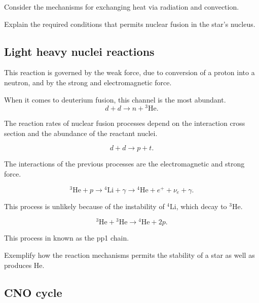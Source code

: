 \documentclass[openany]{book}
\begin{document}
Consider the mechanisms for exchanging heat via radiation and convection.

Explain the required conditions that permits nuclear fusion in the star's nucleus.

\subsection{Light heavy nuclei reactions} \label{sub:lightReactions}

This reaction is governed by the weak force, due to conversion of a proton into a neutron, and by the strong and electromagnetic force.

When it comes to deuterium fusion, this channel is the most abundant.\\

\begin{equation} \label{eq:reaction_2Hdn3He}
	d + d  \rightarrow n + {}^{3}\mathrm{He}.
\end{equation}

The reaction rates of nuclear fusion processes depend on the interaction cross section and the abundance of the reactant nuclei.

\begin{equation}  \label{eq:reaction_2Hdpt}
	d + d \rightarrow p + t.
\end{equation}

The interactions of the previous processes are the electromagnetic and strong force.

\begin{equation} \label{eq:reaction_3HepChain}
	{}^{3}\mathrm{He} + p \rightarrow {}^{4}\mathrm{Li} + \gamma \rightarrow {}^{4}\mathrm{He} + e^{+} +  \nu_e + \gamma.
\end{equation}

This process is unlikely because of the instability of  ${}^{4}\mathrm{Li}$, which decay to ${}^{3}\mathrm{He}$.


\begin{equation} \label{eq:reaction_3Hep3He}
	{}^{3}\mathrm{He} +  {}^{3}\mathrm{He}  \rightarrow {}^{4}\mathrm{He} + 2p.
\end{equation}

This process in known as the pp1 chain.

Exemplify how the reaction mechanisms permits the stability of a star as well as produces He. \\

\subsection{CNO cycle}  \label{sub:CNOCycle}
\end{document}
